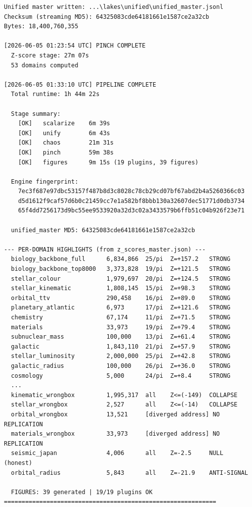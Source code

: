 \documentclass[11pt, letterpaper, openany]{book}
\begin{document}
\begin{empiricalbox}
\begin{lstlisting}[style=terminal]
Unified master written: ...\lakes\unified\unified_master.jsonl
Checksum (streaming MD5): 64325083cde64181661e1587ce2a32cb
Bytes: 18,400,760,355

[2026-06-05 01:23:54 UTC] PINCH COMPLETE
  Z-score stage: 27m 07s
  53 domains computed

[2026-06-05 01:33:10 UTC] PIPELINE COMPLETE
  Total runtime: 1h 44m 22s

  Stage summary:
    [OK]   scalarize    6m 39s
    [OK]   unify        6m 43s
    [OK]   chaos        21m 31s
    [OK]   pinch        59m 38s
    [OK]   figures      9m 15s (19 plugins, 39 figures)

  Engine fingerprint:
    7ec3f687e97dbc53157f487b8d3c8028c78cb29cd07bf67abd2b4a5260366c03
    d5d1612f9caf57d6b0c21459cc7e1a582bf8bbb130a32607dec51771d0db3734
    65f4dd7256173d9bc55ee9533920a32d3c02a3433579b6ffb51c04b926f23e71

  unified_master MD5: 64325083cde64181661e1587ce2a32cb

--- PER-DOMAIN HIGHLIGHTS (from z_scores_master.json) ---
  biology_backbone_full      6,834,866  25/pi  Z=+157.2   STRONG
  biology_backbone_top8000   3,373,828  19/pi  Z=+121.5   STRONG
  stellar_colour             1,979,697  20/pi  Z=+124.5   STRONG
  stellar_kinematic          1,808,145  15/pi  Z=+98.3    STRONG
  orbital_ttv                290,458    16/pi  Z=+89.0    STRONG
  planetary_atlantic         6,973      17/pi  Z=+121.6   STRONG
  chemistry                  67,174     11/pi  Z=+71.5    STRONG
  materials                  33,973     19/pi  Z=+79.4    STRONG
  subnuclear_mass            100,000    13/pi  Z=+61.4    STRONG
  galactic                   1,843,110  21/pi  Z=+57.9    STRONG
  stellar_luminosity         2,000,000  25/pi  Z=+42.8    STRONG
  galactic_radius            100,000    26/pi  Z=+36.0    STRONG
  cosmology                  5,000      24/pi  Z=+8.4     STRONG
  ...
  kinematic_wrongbox         1,995,317  all    Z<=(-149)  COLLAPSE
  stellar_wrongbox           2,527      all    Z<=(-14)   COLLAPSE
  orbital_wrongbox           13,521     [diverged address] NO REPLICATION
  materials_wrongbox         33,973     [diverged address] NO REPLICATION
  seismic_japan              4,006      all    Z=-2.5     NULL (honest)
  orbital_radius             5,843      all    Z=-21.9    ANTI-SIGNAL

  FIGURES: 39 generated | 19/19 plugins OK
============================================================
\end{lstlisting}


\end{empiricalbox}
\end{document}
